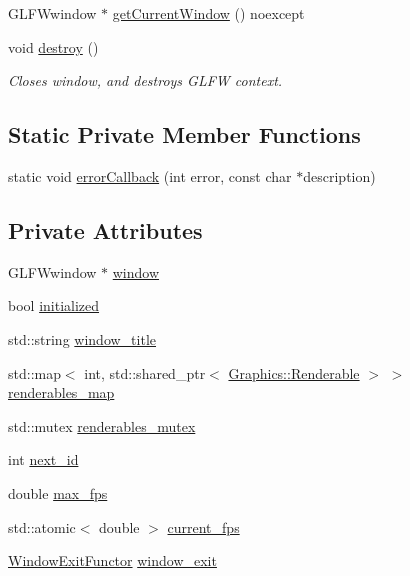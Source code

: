 \begin{DoxyCompactItemize}
G\+L\+F\+Wwindow $\ast$ \hyperlink{class_graphics_1_1_graphics_system_a0692ae8d8615f820ed36615e9619fe68}{get\+Current\+Window} () noexcept
\item 
void \hyperlink{class_graphics_1_1_graphics_system_a629d2fe80f761f4f4004ba74ad458e3f}{destroy} ()
\begin{DoxyCompactList}\small\item\em Closes window, and destroys G\+L\+F\+W context. \end{DoxyCompactList}\end{DoxyCompactItemize}
\subsection*{Static Private Member Functions}
\begin{DoxyCompactItemize}
\item 
static void \hyperlink{class_graphics_1_1_graphics_system_a0e3ea1d3785e868d7a1318b4c9c15878}{error\+Callback} (int error, const char $\ast$description)
\end{DoxyCompactItemize}
\subsection*{Private Attributes}
\begin{DoxyCompactItemize}
\item 
G\+L\+F\+Wwindow $\ast$ \hyperlink{class_graphics_1_1_graphics_system_a4430d61bb3fd528b617e8fea26744a8c}{window}
\item 
bool \hyperlink{class_graphics_1_1_graphics_system_a7228e859a8b7da7d9cbc3e151ab2df72}{initialized}
\item 
std\+::string \hyperlink{class_graphics_1_1_graphics_system_a7b543ac0f4323ec286519a3dfef0df1c}{window\+\_\+title}
\item 
std\+::map$<$ int, std\+::shared\+\_\+ptr$<$ \hyperlink{class_graphics_1_1_renderable}{Graphics\+::\+Renderable} $>$ $>$ \hyperlink{class_graphics_1_1_graphics_system_a5dab770243e04860495f894184ef63bb}{renderables\+\_\+map}
\item 
std\+::mutex \hyperlink{class_graphics_1_1_graphics_system_a2e9549405884607a5922a7023a1d2b38}{renderables\+\_\+mutex}
\item 
int \hyperlink{class_graphics_1_1_graphics_system_a950f878ddd2ca0b13a715f4300447903}{next\+\_\+id}
\item 
double \hyperlink{class_graphics_1_1_graphics_system_ad963821cfb09e6a0e672cf6876e944dd}{max\+\_\+fps}
\item 
std\+::atomic$<$ double $>$ \hyperlink{class_graphics_1_1_graphics_system_aa46f6a4cdcae7ff4603c11a650b2986d}{current\+\_\+fps}
\item 
\hyperlink{class_graphics_1_1_window_exit_functor}{Window\+Exit\+Functor} \hyperlink{class_graphics_1_1_graphics_system_ac31d552052e7afd10043456ee9393e1a}{window\+\_\+exit}
\end{DoxyCompactItemize}


